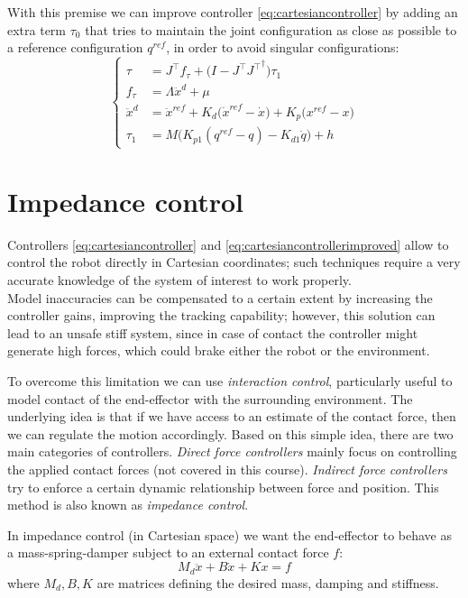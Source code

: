 	With this premise we can improve controller \eqref{eq:cartesiancontroller} by adding an extra term $\tau_0$ that tries to maintain the joint configuration as close as possible to a reference configuration $q^{ref}$, in order to avoid singular configurations:
	\begin{equation} \label{eq:cartesiancontrollerimproved}
	\begin{cases}
		\tau & = J^\top f_\tau +  \big(I - J^\top {J^\top}^\dagger\big) \tau_1\\
		f_\tau & = \Lambda \ddot x^d + \mu \\
		\ddot x^d & = \ddot x^{ref} + K_d\big(\dot x^{ref} - \dot x\big) + K_p\big(x^{ref} - x\big) \\
		\tau_1 & = M\big(K_{p1}(q^{ref} - q) - K_{d1}\dot q\big) + h
	\end{cases}
	\end{equation}
	 
	
\section{Impedance control}
	Controllers \eqref{eq:cartesiancontroller} and \eqref{eq:cartesiancontrollerimproved} allow to control the robot directly in Cartesian coordinates; such techniques require a very accurate knowledge of the system of interest to work properly.\\
	Model inaccuracies can be compensated to a certain extent by increasing the controller gains, improving the tracking capability; however, this solution can lead to an unsafe stiff system, since in case of contact the controller might generate high forces, which could brake either the robot or the environment.
	
	To overcome this limitation we can use \textit{interaction control}, particularly useful to model contact of the end-effector with the surrounding environment. The underlying idea is that if we have access to an estimate of the contact force, then we can regulate the motion accordingly. Based on this simple idea, there are two main categories of controllers.
	\textit{Direct force controllers} mainly focus on controlling the applied contact forces (not covered in this course).
	\textit{Indirect force controllers} try to enforce a certain dynamic relationship between force and position. This method is also known as \textit{impedance control}.
	
	In impedance control (in Cartesian space) we want the end-effector to behave as a mass-spring-damper subject to an external contact force $f$:
	\begin{equation} \label{eq:spring}
		M_d \ddot x + B \dot x + K x = f
	\end{equation}
	where $M_d, B, K$ are matrices defining the desired mass, damping and stiffness.
	
